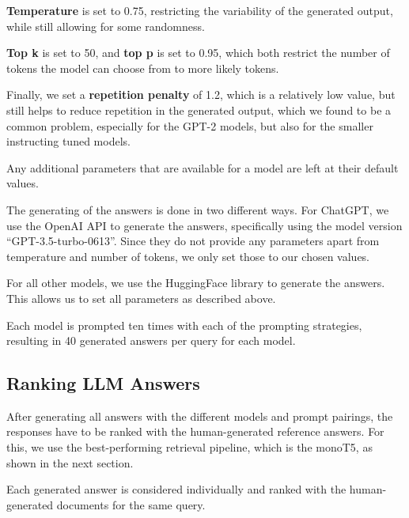 \textbf{Temperature} is set to 0.75, restricting the variability of the generated output, while still allowing for some randomness.

\textbf{Top k} is set to 50, and \textbf{top p} is set to 0.95, which both restrict the number of tokens the model can choose from to more likely tokens.

Finally, we set a \textbf{repetition penalty} of 1.2, which is a relatively low value, but still helps to reduce repetition in the generated output, which we found to be a common problem, especially for the GPT-2 models, but also for the smaller instructing tuned models.

Any additional parameters that are available for a model are left at their default values.


The generating of the answers is done in two different ways.
For ChatGPT, we use the OpenAI API to generate the answers, specifically using the model version ``GPT-3.5-turbo-0613''.
Since they do not provide any parameters apart from temperature and number of tokens, we only set those to our chosen values.

For all other models, we use the HuggingFace library to generate the answers.
This allows us to set all parameters as described above.

Each model is prompted ten times with each of the prompting strategies, resulting in 40 generated answers per query for each model.


\subsection{Ranking LLM Answers}
After generating all answers with the different models and prompt pairings, the responses have to be ranked with the human-generated reference answers.
For this, we use the best-performing retrieval pipeline, which is the monoT5, as shown in the next section.

Each generated answer is considered individually and ranked with the human-generated documents for the same query.